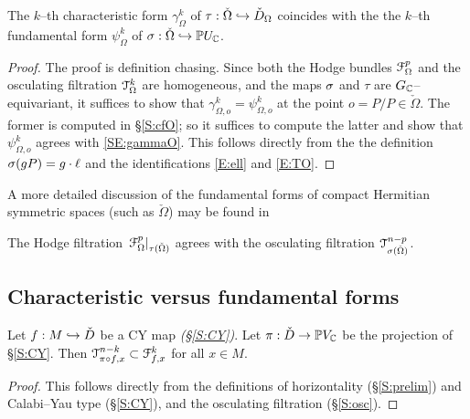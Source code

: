 \documentclass[12pt]{amsart}
\numberwithin{equation}{section}
\numberwithin{table}{section}
\numberwithin{figure}{section}
\begin{document}
\begin{proposition} \label{P:C=F}
The $k$--th characteristic form $\gamma^k_\Omega$ of $\tau : \check\Omega \hookrightarrow \check D_\Omega$ coincides with the the $k$--th fundamental form $\psi^k_\Omega$ of $\sigma : \check\Omega \hookrightarrow \mathbb P U_\mathbb C$.
\end{proposition}

\begin{proof}
The proof is definition chasing.  Since both the Hodge bundles $\mathcal F_\Omega^p$ and the osculating filtration $\mathcal T_\Omega^k$ are homogeneous, and the maps $\sigma$ and $\tau$ are $G_\mathbb C$--equivariant, it suffices to show that $\gamma^k_{\Omega,o} = \psi^k_{\Omega,o}$ at the point $o = P/P \in \check\Omega$.  The former is computed in \S\ref{S:cfO}; so it suffices to compute the latter and show that $\psi^k_{\Omega,o}$ agrees with \eqref{SE:gammaO}.  This follows directly from the the definition $\sigma(gP) = g \cdot \ell$ and the identifications \eqref{E:ell} and \eqref{E:TO}.
\end{proof}

\begin{remark}
A more detailed discussion of the fundamental forms of compact Hermitian symmetric spaces (such as $\check\Omega$) may be found in \cite[\S3]{MR2030098}
\end{remark}

\begin{corollary}\label{C:O-F=E}
The Hodge filtration $\left.\mathcal F^p_\Omega\right|_{\tau(\check\Omega)}$ agrees with the osculating filtration $\mathcal T^{n-p}_{\sigma(\check\Omega)}$.
\end{corollary}

\subsection{Characteristic versus fundamental forms} \label{S:CvF}

\begin{lemma}
Let $f: M \hookrightarrow \check D$ be a CY map \emph{(\S\ref{S:CY})}.  Let $\pi : \check D \to \mathbb P V_\mathbb C$ be the projection of \S\ref{S:CY}.  Then $\mathcal T^{n-k}_{\pi\circ f,x} \subset \mathcal F^k_{f,x}$ for all $x \in M$.
\end{lemma}

\begin{proof}
This follows directly from the definitions of horizontality (\S\ref{S:prelim}) and Calabi--Yau type (\S\ref{S:CY}), and the osculating filtration (\S\ref{S:osc}).
\end{proof}
\end{document}
